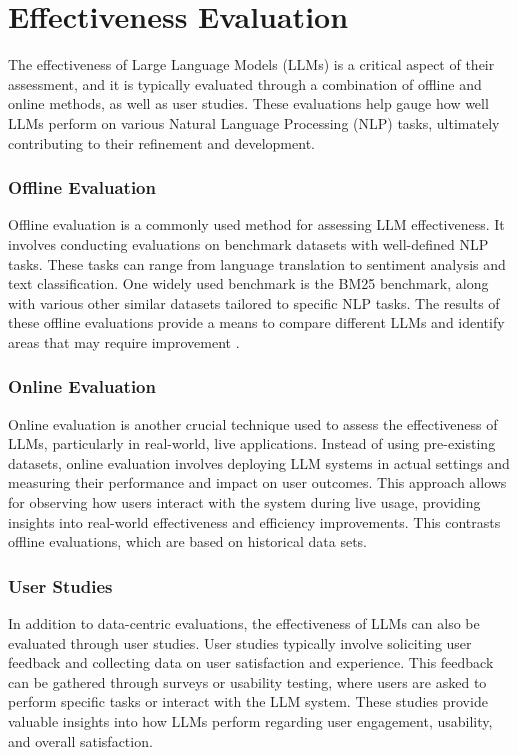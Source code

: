 \section{Effectiveness Evaluation}
The effectiveness of Large Language Models (LLMs) is a critical aspect of their assessment, and it is typically evaluated through a combination of offline and online methods, as well as user studies. These evaluations help gauge how well LLMs perform on various Natural Language Processing (NLP) tasks, ultimately contributing to their refinement and development.

\subsubsection{Offline Evaluation}
Offline evaluation is a commonly used method for assessing LLM effectiveness. It involves conducting evaluations on benchmark datasets with well-defined NLP tasks. These tasks can range from language translation to sentiment analysis and text classification. One widely used benchmark is the BM25 benchmark, along with various other similar datasets tailored to specific NLP tasks. The results of these offline evaluations provide a means to compare different LLMs and identify areas that may require improvement \cite{penha2022}.

\subsubsection{Online Evaluation}
Online evaluation is another crucial technique used to assess the effectiveness of LLMs, particularly in real-world, live applications. Instead of using pre-existing datasets, online evaluation involves deploying LLM systems in actual settings and measuring their performance and impact on user outcomes. This approach allows for observing how users interact with the system during live usage, providing insights into real-world effectiveness and efficiency improvements. This contrasts offline evaluations, which are based on historical data sets.

\subsubsection{User Studies}
In addition to data-centric evaluations, the effectiveness of LLMs can also be evaluated through user studies. User studies typically involve soliciting user feedback and collecting data on user satisfaction and experience. This feedback can be gathered through surveys or usability testing, where users are asked to perform specific tasks or interact with the LLM system. These studies provide valuable insights into how LLMs perform regarding user engagement, usability, and overall satisfaction.


